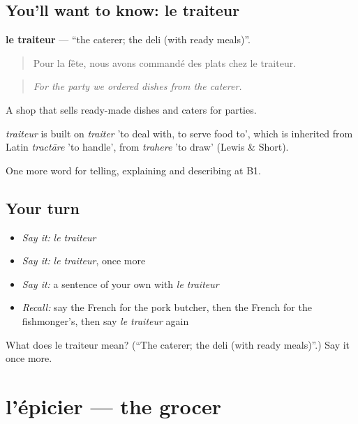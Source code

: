 \subsection*{You'll want to know: le traiteur}
\textbf{le traiteur} — \textquotedblleft{}the caterer; the deli (with ready meals)\textquotedblright{}.

\begin{quote}
Pour la fête, nous avons commandé des plats chez le traiteur.
\end{quote}

\begin{quote}
\emph{For the party we ordered dishes from the caterer.}
\end{quote}

A shop that sells ready-made dishes and caters for parties.

\begin{cousinweb}
\emph{traiteur} is built on \emph{traiter} 'to deal with, to serve food to', which is inherited from Latin \emph{tractāre} 'to handle', from \emph{trahere} 'to draw' (Lewis \& Short).
\end{cousinweb}

\begin{grammarlens}[title={What you've built}]
One more word for telling, explaining and describing at B1.
\end{grammarlens}

\subsection*{Your turn}
\begin{itemize}
\raggedright
  \item \emph{Say it:} \emph{le traiteur}
  \item \emph{Say it:} \emph{le traiteur}, once more
  \item \emph{Say it:} a sentence of your own with \emph{le traiteur}
  \item \emph{Recall:} say the French for the pork butcher, then the French for the fishmonger’s, then say \emph{le traiteur} again
\end{itemize}

\begin{tcolorbox}[breakable,colback=teal!4,colframe=teal!35!black,title={Before you move on}]
What does le traiteur mean? (\textquotedblleft{}The caterer; the deli (with ready meals)\textquotedblright{}.) Say it once more.
\end{tcolorbox}
\section[l'épicier]{l'épicier — the grocer}

